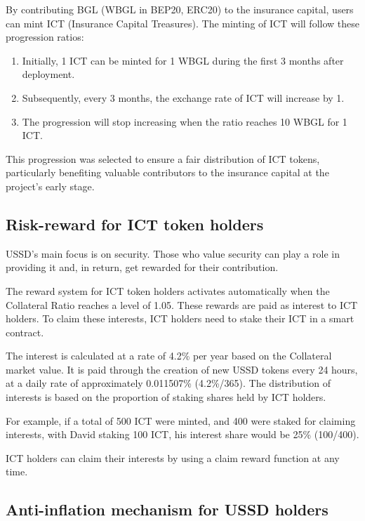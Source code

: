 By contributing BGL (WBGL in BEP20, ERC20) to the insurance capital, users can mint ICT (Insurance Capital Treasures). The minting of ICT will follow these progression ratios:

\begin{enumerate}
    \item Initially, 1 ICT can be minted for 1 WBGL during the first 3 months after deployment.
    \item Subsequently, every 3 months, the exchange rate of ICT will increase by 1.
    \item The progression will stop increasing when the ratio reaches 10 WBGL for 1 ICT.
\end{enumerate}

This progression was selected to ensure a fair distribution of ICT tokens, particularly benefiting valuable contributors to the insurance capital at the project's early stage.


\subsection{Risk-reward for ICT token holders}

USSD's main focus is on security. Those who value security can play a role in providing it and, in return, get rewarded for their contribution.

The reward system for ICT token holders activates automatically when the Collateral Ratio reaches a level of 1.05. These rewards are paid as interest to ICT holders. To claim these interests, ICT holders need to stake their ICT in a smart contract.

The interest is calculated at a rate of 4.2\% per year based on the Collateral market value. It is paid through the creation of new USSD tokens every 24 hours, at a daily rate of approximately 0.011507\% (4.2\%/365). The distribution of interests is based on the proportion of staking shares held by ICT holders.

For example, if a total of 500 ICT were minted, and 400 were staked for claiming interests, with David staking 100 ICT, his interest share would be 25\% (100/400).

ICT holders can claim their interests by using a claim reward function at any time.


\subsection{Anti-inflation mechanism for USSD holders}

